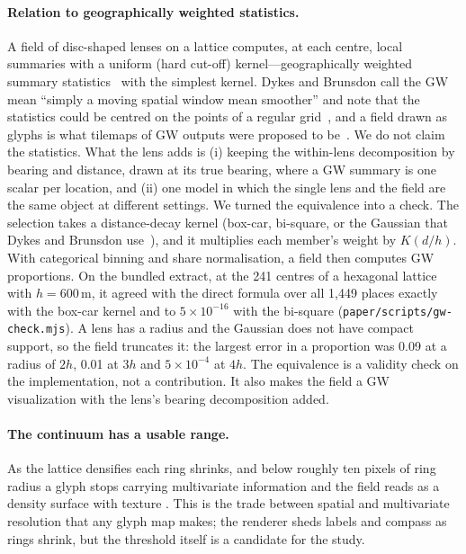 \paragraph{Relation to geographically weighted statistics.} A field of
disc-shaped lenses on a lattice computes, at each centre, local summaries with
a uniform (hard cut-off) kernel---geographically weighted summary
statistics~\cite{brunsdon2002gwss} with the simplest kernel. Dykes and Brunsdon
call the GW mean ``simply a moving spatial window mean smoother'' and note that
the statistics could be centred on the points of a regular
grid~\cite{dykes2007gwvis}, and a field drawn as glyphs is what tilemaps of GW
outputs were proposed to be~\cite{slingsby2018tilemaps}.
We do not claim the statistics. What the lens adds is (i) keeping the
within-lens decomposition by bearing and distance, drawn at its true bearing,
where a GW summary is one scalar per location, and (ii) one model in which the
single lens and the field are the same object at different settings.
We turned the equivalence into a check. The selection takes a distance-decay
kernel (box-car, bi-square, or the Gaussian that Dykes and Brunsdon
use~\cite{dykes2007gwvis}), and it multiplies each member's weight by $K(d/h)$.
With categorical binning and share normalisation, a field then computes GW
proportions. On the bundled extract, at the 241 centres of a hexagonal lattice
with $h = 600$\,m, it agreed with the direct formula over all 1{,}449 places
exactly with the box-car kernel and to $5\times10^{-16}$ with the bi-square
(\texttt{paper/scripts/gw-check.mjs}). A lens has a radius and the Gaussian
does not have compact support, so the field truncates it: the largest error in a
proportion was 0.09 at a radius of $2h$, 0.01 at $3h$ and $5\times10^{-4}$ at
$4h$. The equivalence is a validity check on the implementation, not a
contribution. It also makes the field a GW visualization with the lens's
bearing decomposition added.

\paragraph{The continuum has a usable range.} As the lattice densifies each
ring shrinks, and below roughly ten pixels of ring radius a glyph stops
carrying multivariate information and the field reads as a density surface with
texture . This is the trade between spatial and multivariate resolution that
any glyph map makes; the renderer sheds labels and compass as rings shrink, but
the threshold itself is a candidate for the study.


